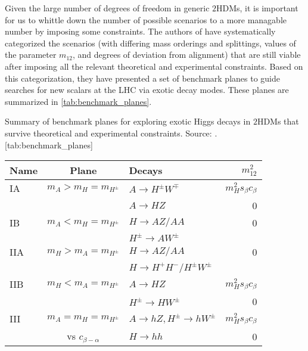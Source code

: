 Given the large number of degrees of freedom in generic $2$HDMs, it is important for us to whittle down the number of possible scenarios to a more managable number by imposing some constraints. The authors of \cite{Kling:2016opi} have systematically categorized the scenarios (with differing mass orderings and splittings, values of the parameter $m_{12}$, and degrees of deviation from alignment) that are still viable after imposing all the relevant theoretical and experimental constraints. Based on this categorization, they have presented a set of benchmark planes to guide searches for new scalars at the LHC via exotic decay modes. These planes are summarized in \autoref{tab:benchmark_planes}. 

\begin{table}
  \begin{sidecaption}{Summary of benchmark planes for exploring exotic Higgs decays in $2$HDMs that survive theoretical and experimental constraints. Source: \cite{Kling:2016opi}.}[tab:benchmark_planes]
  \centering
  \begin{tabular}{lclr}
    \toprule
    Name    & Plane                   & Decays                                    & $m_{12}^2$\\\midrule
    IA      & $m_A > m_H = m_{H^\pm}$ & $A\rightarrow H^\pm W^\mp$                & $m_H^2s_\beta c_\beta$\\
            &                         & $A\rightarrow HZ$                         & 0 \\\midrule
    IB      & $m_A < m_H = m_{H^\pm}$ & $H\rightarrow AZ/AA$                      & 0\\
            &                         & $H^\pm\rightarrow AW^\pm$                 & \\\midrule
    IIA     & $m_H > m_A = m_{H^\pm}$ & $H\rightarrow AZ/AA$                      & 0\\
            &                         & $H\rightarrow H^+H^-/H^\pm W^\pm$         & \\\midrule
    IIB     & $m_H < m_A = m_{H^\pm}$ & $A\rightarrow HZ$                         & $m_H^2s_\beta c_\beta$\\
            &                         & $H^\pm\rightarrow HW^\pm$                 & 0 \\\midrule
    III     & $m_A = m_H = m_{H^\pm}$ & $A\rightarrow hZ,H^\pm\rightarrow hW^\pm$ & $m_H^2s_\beta c_\beta$\\
            & vs $c_{\beta-\alpha}$   & $H\rightarrow hh$                         & 0 \\
    \bottomrule
  \end{tabular}
\end{sidecaption}
\end{table}

